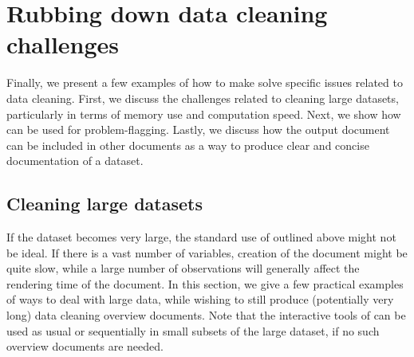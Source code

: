 \documentclass[article,shortnames]{jss}
\newcommand{\hl}[1]{\textcolor{magenta}{#1}}
\newcommand{\R}[1]{\code{#1}}
\begin{document}
\section{Rubbing down data cleaning challenges}
\label{sec:specificExamples}

Finally, we present a few examples of how to make 
solve specific issues related to data cleaning. First, we discuss the
challenges related to cleaning large datasets, particularly in terms
of memory use and computation speed. Next, we show how 
can be used for problem-flagging. Lastly, we discuss how the
 output document can be included in other 
documents as a way to produce clear and concise documentation of a
dataset. %

\subsection{Cleaning large datasets}
If the dataset becomes very large, the standard use of \R{clean()}
outlined above might not be ideal. If there is a vast number of
variables, creation of the  document might be quite
slow, while a large number of observations will generally affect the
rendering time of the document. In this section, we give a few
practical examples of ways to deal with large data, while wishing to
still produce (potentially very long) data cleaning overview
documents. Note that the interactive tools of  can be used
as usual or sequentially in small subsets of the large dataset, if no
such overview documents are needed.
\end{document}
